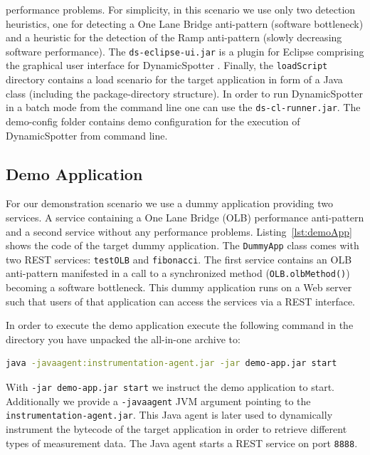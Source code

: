 \documentclass{report}
\newcommand{\DS}{DynamicSpotter }
\begin{document}
performance problems. For simplicity, in this scenario we use only two detection heuristics, one for detecting a One
Lane Bridge anti-pattern (software bottleneck) and a heuristic for the detection of the Ramp anti-pattern (slowly
decreasing software performance). The \texttt{ds-eclipse-ui.jar} is a plugin for Eclipse comprising the graphical user
interface for \DS. Finally, the \texttt{loadScript} directory contains a load scenario for the target application in
form of a Java class (including the package-directory structure). In order to run \DS in a batch mode from the command
line one can use the \texttt{ds-cl-runner.jar}. The demo-config folder contains demo configuration for the execution of
\DS from command line.

\subsection{Demo Application}
\label{sec:demoApp}
For our demonstration scenario we use a dummy application providing two services. A service containing a One Lane Bridge
(OLB) performance anti-pattern and a second service without any performance problems. Listing~\ref{lst:demoApp} shows
the code of the target dummy application. The \texttt{DummyApp} class comes with two REST services: \texttt{testOLB} and
\texttt{fibonacci}. The first service contains an OLB anti-pattern manifested in a call to a synchronized method
(\texttt{OLB.olbMethod()}) becoming a software bottleneck. This dummy application runs on a Web server such that users
of that application can access the services via a REST interface.



In order to execute the demo application execute the following command in the directory you have unpacked the all-in-one
archive to:
\begin{lstlisting}[language=sh,morekeywords={java,javaagent,\-jar}, frame=single]
java -javaagent:instrumentation-agent.jar -jar demo-app.jar start
\end{lstlisting}
With \texttt{-jar demo-app.jar start} we instruct the demo application to start. Additionally we provide a
\texttt{-javaagent} JVM argument pointing to the \texttt{instrumentation-agent.jar}. This Java agent is later used to
dynamically instrument the bytecode of the target application in order to retrieve different types of measurement data.
The Java agent starts a REST service on port \texttt{8888}.
\end{document}
